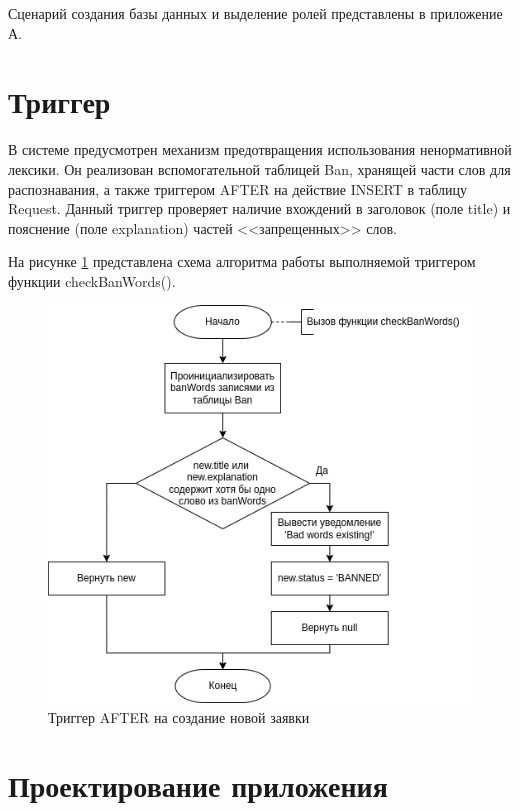 Сценарий создания базы данных и выделение ролей представлены в приложение А.

\section{Триггер}

В системе предусмотрен механизм предотвращения использования ненормативной лексики. Он реализован вспомогательной таблицей Ban, хранящей части слов для распознавания,  а также триггером AFTER на действие INSERT в таблицу Request. Данный триггер проверяет наличие вхождений в заголовок (поле title) и пояснение (поле explanation) частей <<запрещенных>> слов.

На рисунке \ref{trigger} представлена схема алгоритма работы выполняемой триггером функции checkBanWords().

\begin{figure}[H]
	\begin{center}
		\includegraphics[scale=0.6]{assets/trigger.png}
	\end{center}
	\caption{Триггер AFTER на создание новой заявки}
	\label{trigger}
\end{figure}

\section{Проектирование приложения}

